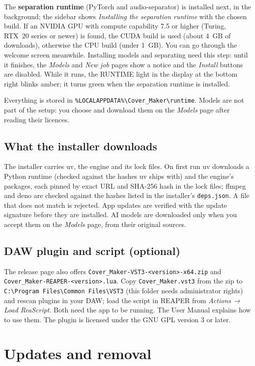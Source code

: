 \documentclass{covermaker}
\begin{document}
The \textbf{separation runtime} (PyTorch and audio-separator) is installed
next, in the background; the sidebar shows \emph{Installing the separation
runtime} with the chosen build. If an NVIDIA GPU with compute capability 7.5
or higher (Turing, RTX~20 series or newer) is found, the CUDA build is used
(about 4~GB of downloads), otherwise the CPU build (under 1~GB). You can go
through the welcome screen meanwhile. Installing models and separating need
this step: until it finishes, the \emph{Models} and \emph{New job} pages show a
notice and the \emph{Install} buttons are disabled. While it runs, the \textsf{RUNTIME} light in the display at the bottom right
blinks amber; it turns green when the separation runtime is installed.

Everything is stored in
\texttt{\%LOCALAPPDATA\%\textbackslash Cover\_Maker\textbackslash runtime}.
Models are not part of the setup: you choose and download them on the
\emph{Models} page after reading their licences.

\section{What the installer downloads}
The installer carries uv, the engine and its lock files. On first run uv
downloads a Python runtime (checked against the hashes uv ships with) and the
engine's packages, each pinned by exact URL and SHA-256 hash in the lock files;
ffmpeg and deno are checked against the hashes listed in the installer's
\texttt{deps.json}. A file that does not match is rejected.
App updates are verified with the update signature before
they are installed. AI models are downloaded only when you accept them on the
\emph{Models} page, from their original sources.

\section{DAW plugin and script (optional)}
The release page also offers \texttt{Cover\_Maker-VST3-<version>-x64.zip} and
\texttt{Cover\_Maker-REAPER-<version>.lua}. Copy \texttt{Cover\_Maker.vst3}
from the zip to
\texttt{C:\textbackslash Program Files\textbackslash Common Files\textbackslash VST3}
(this folder needs administrator rights) and rescan plugins in your DAW; load
the script in REAPER from \emph{Actions → Load ReaScript}. Both need the app
to be running. The User Manual explains how to use them. The plugin is
licensed under the GNU GPL version 3 or later.

\chapter{Updates and removal}
\end{document}
